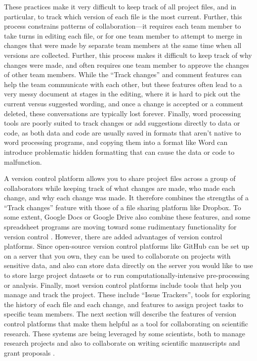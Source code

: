 \documentclass[]{tufte-book}
\begin{document}
These practices make it very difficult to keep track of all project files,
and in particular, to track which version of each file is the most current.
Further, this process constrains patterns of collaboration---it requires
each team member to take turns in editing each file, or for one team member
to attempt to merge in changes that were made by separate team members at
the same time when all versions are collected. Further, this process makes
it difficult to keep track of why changes were made, and often requires
one team member to approve the changes of other team members. While the
``Track changes'' and comment features can help the team communicate with
each other, but these features often lead to a very messy document at
stages in the editing, where it is hard to pick out the current versus
suggested wording, and once a change is accepted or a comment deleted,
these conversations are typically lost forever. Finally, word processing
tools are poorly suited to track changes or add suggestions directly to
data or code, as both data and code are usually saved in formats that
aren't native to word processing programs, and copying them into a format
like Word can introduce problematic hidden formatting that can cause the
data or code to malfunction.

A version control platform allows you to share project files across a group of
collaborators while keeping track of what changes are made, who made each
change, and why each change was made. It therefore combines the strengths of a
``Track changes'' feature with those of a file sharing platform like Dropbox. To
some extent, Google Docs or Google Drive also combine these features, and some
spreadsheet programs are moving toward some rudimentary functionality for
version control \citep{birch2018future}. However, there are added advantages of
version control platforms. Since open-source version control platforms like
GitHub can be set up on a server that you own, they can be used to collaborate
on projects with sensitive data, and also can store data directly on the server
you would like to use to store large project datasets or to run
computationally-intensive pre-processing or analysis. Finally, most version
control platforms include tools that help you manage and track the project.
These include ``Issue Trackers'', tools for exploring the history of each file
and each change, and features to assign project tasks to specific team members.
The next section will describe the features of version control platforms that
make them helpful as a tool for collaborating on scientific research. These
systems are being leveraged by some scientists, both to manage research projects
and also to collaborate on writing scientific manuscripts and grant proposals
\citep{perez2016ten}.
\end{document}
